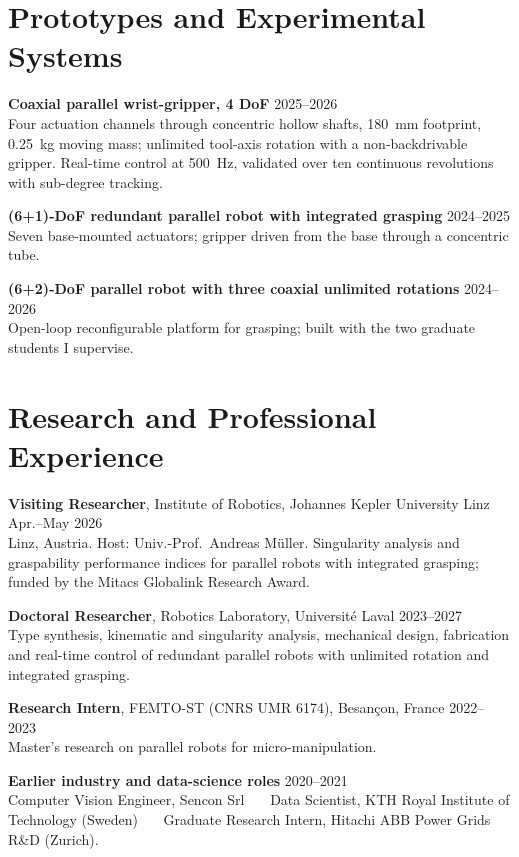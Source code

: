 \documentclass[11pt,letterpaper]{article}
\newenvironment{items}{\begin{list}{}{%
  \setlength{\leftmargin}{1.4em}\setlength{\itemindent}{-0.4em}
  \setlength{\itemsep}{0.5pt}\setlength{\parsep}{0pt}\setlength{\topsep}{1pt}}}%
  {\end{list}}
\newcommand{\dateline}[1]{\hfill{\footnotesize\color{cap} #1}}
\begin{document}
\section{Prototypes and Experimental Systems}
\begin{items}
\item[] \textbf{Coaxial parallel wrist-gripper, 4 DoF} \dateline{2025--2026}\\
{\footnotesize Four actuation channels through concentric hollow shafts, 180~mm footprint, 0.25~kg moving mass;
unlimited tool-axis rotation with a non-backdrivable gripper. Real-time control at 500~Hz, validated over ten
continuous revolutions with sub-degree tracking.}
\item[] \textbf{(6+1)-DoF redundant parallel robot with integrated grasping} \dateline{2024--2025}\\
{\footnotesize Seven base-mounted actuators; gripper driven from the base through a concentric tube.}
\item[] \textbf{(6+2)-DoF parallel robot with three coaxial unlimited rotations} \dateline{2024--2026}\\
{\footnotesize Open-loop reconfigurable platform for grasping; built with the two graduate students I supervise.}
\end{items}

\section{Research and Professional Experience}
\begin{items}
\item[] \textbf{Visiting Researcher}, Institute of Robotics, Johannes Kepler University Linz \dateline{Apr.--May 2026}\\
{\footnotesize Linz, Austria. Host: Univ.-Prof.~Andreas M\"uller. Singularity analysis and graspability performance
indices for parallel robots with integrated grasping; funded by the Mitacs Globalink Research Award.}
\item[] \textbf{Doctoral Researcher}, Robotics Laboratory, Universit\'e Laval \dateline{2023--2027}\\
{\footnotesize Type synthesis, kinematic and singularity analysis, mechanical design, fabrication and real-time control
of redundant parallel robots with unlimited rotation and integrated grasping.}
\item[] \textbf{Research Intern}, FEMTO-ST (CNRS UMR 6174), Besan\c{c}on, France \dateline{2022--2023}\\
{\footnotesize Master's research on parallel robots for micro-manipulation.}
\item[] \textbf{Earlier industry and data-science roles} \dateline{2020--2021}\\
{\footnotesize Computer Vision Engineer, Sencon Srl \ \textbullet\ \ Data Scientist, KTH Royal Institute of Technology
(Sweden) \ \textbullet\ \ Graduate Research Intern, Hitachi ABB Power Grids R\&D (Zurich).}
\end{items}
\end{document}
